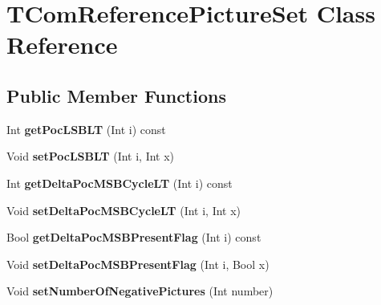 \hypertarget{class_t_com_reference_picture_set}{}\section{T\+Com\+Reference\+Picture\+Set Class Reference}
\label{class_t_com_reference_picture_set}
\subsection*{Public Member Functions}
\begin{DoxyCompactItemize}
\item 
\mbox{\label{class_t_com_reference_picture_set_a1ce227c73ffed287f761c104e7f0b77e}} 
Int {\bfseries get\+Poc\+L\+S\+B\+LT} (Int i) const
\item 
\mbox{\label{class_t_com_reference_picture_set_a45f46d3d3524c5876ce7304b3e833e47}} 
Void {\bfseries set\+Poc\+L\+S\+B\+LT} (Int i, Int x)
\item 
\mbox{\label{class_t_com_reference_picture_set_a55068976a05cccc8c1eb831ae6677462}} 
Int {\bfseries get\+Delta\+Poc\+M\+S\+B\+Cycle\+LT} (Int i) const
\item 
\mbox{\label{class_t_com_reference_picture_set_aac8ede9dd0a4dcca83d592d8c01ceaf9}} 
Void {\bfseries set\+Delta\+Poc\+M\+S\+B\+Cycle\+LT} (Int i, Int x)
\item 
\mbox{\label{class_t_com_reference_picture_set_ad692c61ca0faf81917ba414604003851}} 
Bool {\bfseries get\+Delta\+Poc\+M\+S\+B\+Present\+Flag} (Int i) const
\item 
\mbox{\label{class_t_com_reference_picture_set_a47366bfe77c8ff10be5074722d544eda}} 
Void {\bfseries set\+Delta\+Poc\+M\+S\+B\+Present\+Flag} (Int i, Bool x)
\item 
\mbox{\label{class_t_com_reference_picture_set_ae2fd1024955ec1c783343b964a3a4bae}} 
Void {\bfseries set\+Number\+Of\+Negative\+Pictures} (Int number)
\item 

\end{DoxyCompactItemize}
